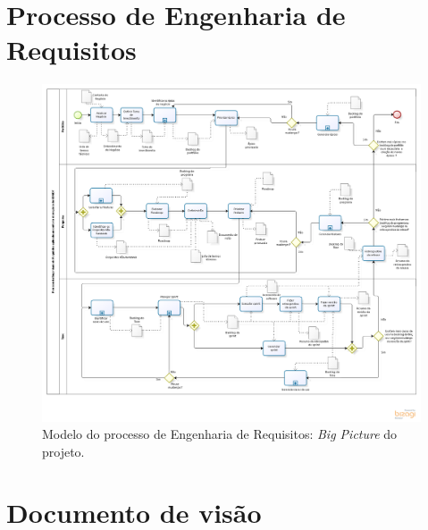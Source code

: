 \begin{apendicesenv}
  
  \chapter{Processo de Engenharia de Requisitos}
  
    \begin{figure}[!htbp]
      \centering
      \includegraphics[scale=0.46, angle = 90]{editaveis/figuras/project_big_picture}
      \caption[Modelo do processo de Engenharia de Requisitos]
	  {Modelo do processo de Engenharia de Requisitos: \textit{Big Picture} do projeto.}
      \label{project_big_picture}
    \end{figure}
  
  \chapter{Documento de visão}
  

\end{apendicesenv}
